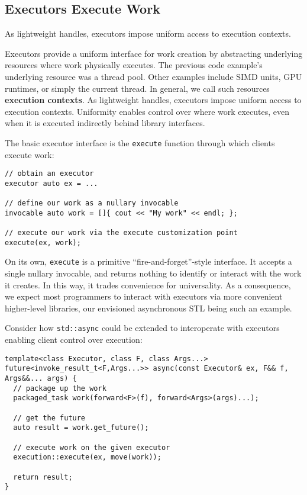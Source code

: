 \documentclass[a4paper,12pt,notitlepage,twoside,openright]{article}
\begin{document}
\hypertarget{executors-execute-work}{%
\subsection{Executors Execute Work}\label{executors-execute-work}}

As lightweight handles, executors impose uniform access to execution
contexts.

Executors provide a uniform interface for work creation by abstracting
underlying resources where work physically executes. The previous code
example's underlying resource was a thread pool. Other examples include
SIMD units, GPU runtimes, or simply the current thread. In general, we
call such resources \textbf{execution contexts}. As lightweight handles,
executors impose uniform access to execution contexts. Uniformity
enables control over where work executes, even when it is executed
indirectly behind library interfaces.

The basic executor interface is the \texttt{execute}
function through which clients execute work:

\begin{verbatim}
// obtain an executor
executor auto ex = ...

// define our work as a nullary invocable
invocable auto work = []{ cout << "My work" << endl; };

// execute our work via the execute customization point
execute(ex, work);
\end{verbatim}

On its own, \texttt{execute} is a primitive
``fire-and-forget''-style interface. It accepts a single nullary
invocable, and returns nothing to identify or interact with the work it
creates. In this way, it trades convenience for universality. As a
consequence, we expect most programmers to interact with executors via
more convenient higher-level libraries, our envisioned asynchronous STL
being such an example.

Consider how \texttt{std::async} could be extended to
interoperate with executors enabling client control over execution:

\begin{verbatim}
template<class Executor, class F, class Args...>
future<invoke_result_t<F,Args...>> async(const Executor& ex, F&& f, Args&&... args) {
  // package up the work
  packaged_task work(forward<F>(f), forward<Args>(args)...);

  // get the future
  auto result = work.get_future();

  // execute work on the given executor
  execution::execute(ex, move(work));

  return result;
}
\end{verbatim}
\end{document}
